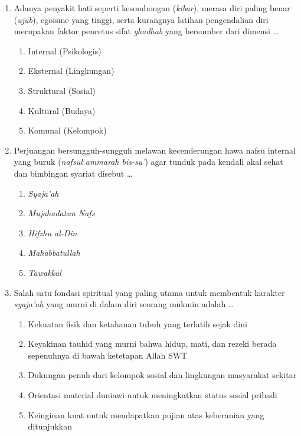 \documentclass[12pt,a4paper]{article}
\begin{document}
\begin{enumerate}[leftmargin=*]
\item Adanya penyakit hati seperti kesombongan (\textit{kibar}), merasa diri paling benar (\textit{ujub}), egoisme yang tinggi, serta kurangnya latihan pengendalian diri merupakan faktor pencetus sifat \textit{ghadhab} yang bersumber dari dimensi \dots
    \begin{enumerate}[label=\alph*.]
        \item Internal (Psikologis)
        \item Eksternal (Lingkungan)
        \item Struktural (Sosial)
        \item Kultural (Budaya)
        \item Komunal (Kelompok)
    \end{enumerate}

\item Perjuangan bersungguh-sungguh melawan kecenderungan hawa nafsu internal yang buruk (\textit{nafsul ammarah bis-su'}) agar tunduk pada kendali akal sehat dan bimbingan syariat disebut \dots
    \begin{enumerate}[label=\alph*.]
        \item \textit{Syaja'ah}
        \item \textit{Mujahadatun Nafs}
        \item \textit{Hifzhu al-Din}
        \item \textit{Mahabbatullah}
        \item \textit{Tawakkal}
    \end{enumerate}

\item Salah satu fondasi spiritual yang paling utama untuk membentuk karakter \textit{syaja'ah} yang murni di dalam diri seorang mukmin adalah \dots
    \begin{enumerate}[label=\alph*.]
        \item Kekuatan fisik dan ketahanan tubuh yang terlatih sejak dini
        \item Keyakinan tauhid yang murni bahwa hidup, mati, dan rezeki berada sepenuhnya di bawah ketetapan Allah SWT
        \item Dukungan penuh dari kelompok sosial dan lingkungan masyarakat sekitar
        \item Orientasi material duniawi untuk meningkatkan status sosial pribadi
        \item Keinginan kuat untuk mendapatkan pujian atas keberanian yang ditunjukkan
    \end{enumerate}


\end{enumerate}
\end{document}
